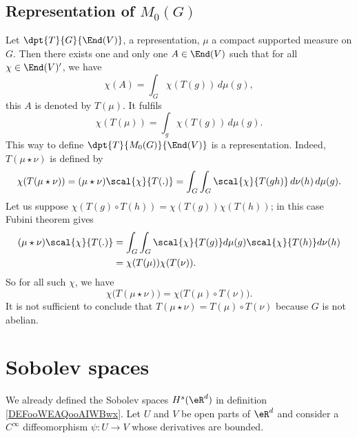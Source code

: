 \subsection{Representation of \texorpdfstring{$M_0(G)$}{M0G}}

Let $\dpt{T}{G}{\End(V)}$, a representation, $\mu$ a compact supported measure on $G$. Then there exists one and only one $A\in\End(V)$ such that for all $\chi\in\End(V)'$, we have
\begin{equation}
  \chi(A)=\int_G\chi(T(g))\,d\mu(g),
\end{equation}
this $A$ is denoted by $T(\mu)$. It fulfils
\begin{equation}
  \chi(T(\mu))=\int_g\chi(T(g))\,d\mu(g).
\end{equation}
This way to define $\dpt{T}{M_0(G)}{\End(V)}$ is a representation. Indeed, $T(\mu\star\nu)$ is defined by
\begin{equation}
\chi(T(\mu\star\nu))	=(\mu\star\nu)\scal{\chi}{T(.)}
			=\int_G\int_G\scal{\chi}{T(gh)}\,d\nu(h)\,d\mu(g).
\end{equation}
Let us suppose $\chi(T(g)\circ T(h))=\chi(T(g))\chi(T(h))$; in this case Fubini theorem gives
\begin{equation}
\begin{split}
  (\mu\star\nu)\scal{\chi}{T(.)}&=\int_G\int_G\scal{\chi}{T(g)}d\mu(g)\scal{\chi}{T(h)}d\nu(h)\\
			&=\chi(T(\mu))\chi(T(\nu)).
\end{split}
\end{equation}
So for all such $\chi$, we have
\[ 
  \chi\big(T(\mu\star\nu)\big)=\chi\big(T(\mu)\circ T(\nu)\big).
\]
It is not sufficient to conclude that $T(\mu\star\nu)=T(\mu)\circ T(\nu)$ because $G$ is not abelian.

\section{Sobolev spaces}    \label{SECooXIVNooJhuqPC}

We already defined the Sobolev spaces \( H^s(\eR^d)\) in definition \ref{DEFooWEAQooAIWBwx}. Let \( U\) and \( V\) be open parts of \( \eR^d\) and consider a \(  C^{\infty}\) diffeomorphism \( \psi\colon U\to V\) whose derivatives are bounded.

